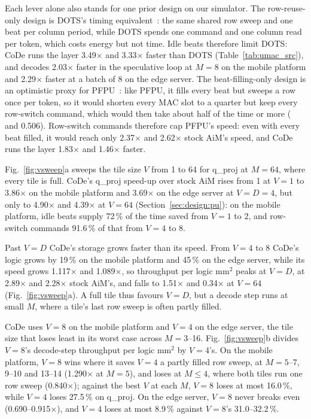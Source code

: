 Each lever alone also stands for one prior design on our simulator. The row-reuse-only design is DOTS's timing
equivalent~\cite{dots}: the same shared row sweep and one beat per column period, while DOTS spends one command and
one column read per token, which costs energy but not time. Idle beats therefore limit DOTS: CoDe runs the layer
3.49$\times$ and 3.33$\times$ faster than DOTS (Table~\ref{tab:umac_src}), and decodes 2.03$\times$ faster in the
speculative loop at $M = 8$ on the mobile platform and 2.29$\times$ faster at a batch of 8 on the edge server. The
beat-filling-only design is an optimistic proxy for PFPU~\cite{pfpu}: like PFPU, it fills every beat but sweeps a row
once per token, so it would shorten every MAC slot to a quarter but keep every row-switch command, which would then
take about half of the time or more ( and 0.506). Row-switch commands therefore cap PFPU's speed: even
with every beat filled, it would reach only 2.37$\times$ and 2.62$\times$ stock AiM's speed, and CoDe runs the layer
1.83$\times$ and 1.46$\times$ faster.

Fig.~\ref{fig:vsweep}a sweeps the tile size $V$ from 1 to 64 for q\_proj at $M = 64$, where every tile is full.
CoDe's q\_proj speed-up over stock AiM rises from 1 at $V = 1$ to 3.86$\times$ on the mobile platform and
3.69$\times$ on the edge server at $V = D = 4$, but only to 4.90$\times$ and 4.39$\times$ at $V = 64$
(Section~\ref{sec:design:pu}): on the mobile platform, idle beats supply 72\,\% of the time saved from $V = 1$ to 2,
and row-switch commands 91.6\,\% of that from $V = 4$ to 8.

Past $V = D$ CoDe's storage grows faster than its speed. From $V = 4$ to 8 CoDe's logic grows by 19\,\% on the
mobile platform and 45\,\% on the edge server, while its speed grows 1.117$\times$ and 1.089$\times$, so throughput
per logic mm$^2$ peaks at $V = D$, at 2.89$\times$ and 2.28$\times$ stock AiM's, and falls to 1.51$\times$ and
0.34$\times$ at $V = 64$ (Fig.~\ref{fig:vsweep}a). A full tile thus favours $V = D$, but a decode step runs at small
$M$, where a tile's last row sweep is often partly filled.

CoDe uses $V = 8$ on the mobile platform and $V = 4$ on the edge server, the tile size that loses least in its worst
case across $M = 3$--16. Fig.~\ref{fig:vsweep}b divides $V = 8$'s decode-step throughput per logic mm$^2$ by $V = 4$'s. On the
mobile platform, $V = 8$ wins where it saves $V = 4$ a partly filled row sweep, at $M = 5$--7, 9--10 and 13--14
(1.290$\times$ at $M = 5$), and loses at $M \le 4$, where both tiles run one row sweep (0.840$\times$); against the
best $V$ at each $M$, $V = 8$ loses at most 16.0\,\%, while $V = 4$ loses 27.5\,\% on q\_proj. On the edge server, $V = 8$ never
breaks even (0.690--0.915$\times$), and $V = 4$ loses at most 8.9\,\% against $V = 8$'s 31.0--32.2\,\%.

